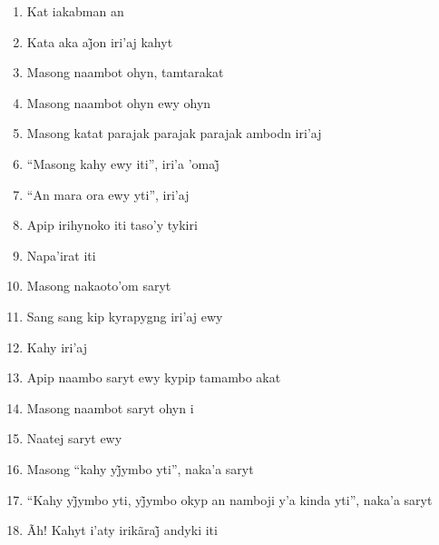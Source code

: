 \begin{enumerate}
 \item Kat iakabman an

 \item Kata aka aj̃on iri’aj kahyt

 \begin{center}\end{center}

 \item Masong naambot ohyn, tamtarakat

 \item Masong naambot ohyn ewy ohyn

 \item Masong katat parajak parajak parajak ambodn iri'aj

 \item ``Masong kahy ewy iti'', iri’a ’omaj̃

 \item ``An mara ora ewy yti'', iri'aj

 \item Apip irihynoko iti taso'y tykiri

 \item Napa'irat iti

 \begin{center}\end{center}

 \item Masong nakaoto'om saryt

 \item Sang sang kip kyrapygng iri'aj ewy

 \item Kahy iri'aj

 \item Apip naambo saryt ewy kypip tamambo akat

 \item Masong naambot saryt ohyn i

 \item Naatej saryt ewy

 \begin{center}\end{center}

 \item Masong ``kahy yj̃ymbo yti'', naka’a saryt

 \item ``Kahy yj̃ymbo yti, yj̃ymbo okyp an namboji y’a kinda yti'', naka’a saryt

 \item Ãh! Kahyt i’aty irikãraj̃ andyki iti


\end{enumerate}
